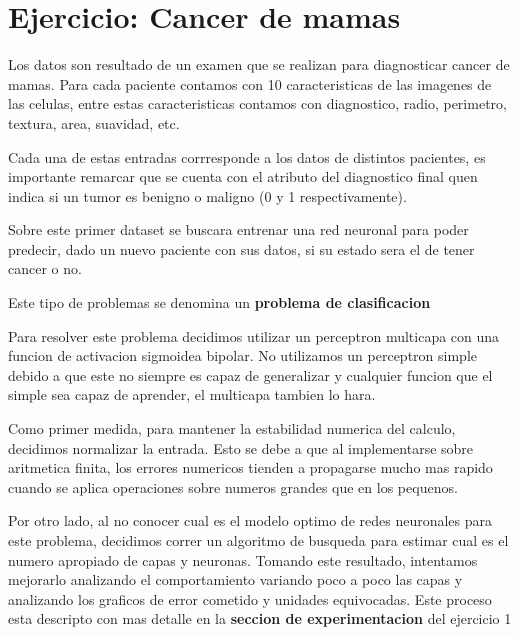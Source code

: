 \section{Ejercicio: Cancer de mamas}
Los datos son resultado de un examen que se realizan para diagnosticar cancer de mamas. Para cada paciente contamos con 10 caracteristicas de las imagenes de las celulas, entre estas caracteristicas contamos con diagnostico, radio, perimetro, textura, area, suavidad, etc. 

Cada una de estas entradas corrresponde a los datos de distintos pacientes, es importante remarcar que se cuenta con el atributo del diagnostico final quen indica si un tumor es benigno o maligno (0 y 1 respectivamente).

Sobre este primer dataset se buscara entrenar una red neuronal para poder predecir, dado un nuevo paciente con sus datos, si su estado sera el de tener cancer o no.

Este tipo de problemas se denomina un \textbf{problema de clasificacion}

Para resolver este problema decidimos utilizar un perceptron multicapa con una funcion de activacion sigmoidea bipolar. No utilizamos un perceptron simple debido a que este no siempre es capaz de generalizar y cualquier funcion que el simple sea capaz de aprender, el multicapa tambien lo hara.

Como primer medida, para mantener la estabilidad numerica del calculo, decidimos normalizar la entrada. Esto se debe a que al implementarse sobre aritmetica finita, los errores numericos tienden a propagarse mucho mas rapido cuando se aplica operaciones sobre numeros grandes que en los pequenos.

Por otro lado, al no conocer cual es el modelo optimo de redes neuronales para este problema, decidimos correr un algoritmo de busqueda para estimar cual es el numero apropiado de capas y neuronas. Tomando este resultado, intentamos mejorarlo analizando el comportamiento variando poco a poco las capas y analizando los graficos de error cometido y unidades equivocadas. Este proceso esta descripto con mas detalle en la \textbf{seccion de experimentacion} del ejercicio 1
